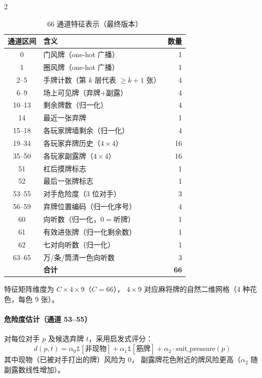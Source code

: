 \documentclass{article}
\begin{document}
\begin{multicols}{2}
\begin{table}[H]
\centering
\caption{66 通道特征表示（最终版本）}
\label{tab:features}
\small
\setlength{\tabcolsep}{4pt}
\begin{tabular}{clr}
\toprule
通道区间 & 含义 & 数量 \\
\midrule
0       & 门风牌（one-hot 广播）     & 1  \\
1       & 圈风牌（one-hot 广播）     & 1  \\
2--5    & 手牌计数（第 $k$ 层代表 $\geq\!k\!+\!1$ 张）& 4  \\
6--9    & 场上可见牌（弃牌+副露）    & 4  \\
10--13  & 剩余牌数（归一化）         & 4  \\
14      & 最近一张弃牌               & 1  \\
15--18  & 各玩家牌墙剩余（归一化）   & 4  \\
19--34  & 各玩家弃牌历史（$4\times4$）& 16 \\
35--50  & 各玩家副露牌（$4\times4$） & 16 \\
51      & 杠后摸牌标志               & 1  \\
52      & 最后一张牌标志             & 1  \\
53--55  & 对手危险度（3 位对手）     & 3  \\
56--59  & 弃牌位置编码（归一化序号） & 4  \\
60      & 向听数（归一化，$0\!=\!$听牌）& 1  \\
61      & 有效进张牌（归一化剩余数） & 1  \\
62      & 七对向听数（归一化）       & 1  \\
63--65  & 万/条/筒清一色向听数       & 3  \\
\midrule
        & \textbf{合计}              & \textbf{66} \\
\bottomrule
\end{tabular}
\end{table}

特征矩阵维度为 $C \times 4 \times 9$（$C=66$），
$4\times9$ 对应麻将牌的自然二维网格（4 种花色，每色 9 张）。

\paragraph{危险度估计（通道 53--55）}
对每位对手 $p$ 及候选弃牌 $t$，采用启发式评分：
\begin{equation}
d(p,t) = \alpha_0 \mathbb{1}[\text{非现物}]
        + \alpha_1 \mathbb{1}[\text{筋牌}]
        + \alpha_2 \cdot \text{suit\_pressure}(p)
\label{eq:danger}
\end{equation}
其中现物（已被对手打出的牌）风险为 0，
副露牌花色附近的牌风险更高（$\alpha_2$ 随副露数线性增加）。


\end{multicols}
\end{document}
